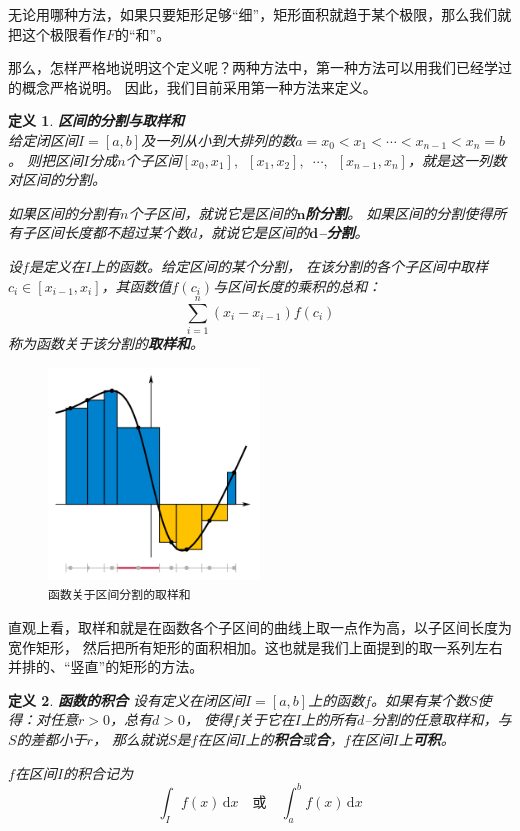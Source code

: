\documentclass[12pt,UTF8]{ctexbook}
\newcommand{\di}[1]{\,\mathrm{d}#1}
\newtheorem{df}{定义}[section]
\begin{document}
无论用哪种方法，如果只要矩形足够“细”，矩形面积就趋于某个极限，那么我们就把这个极限看作$F$的“和”。

那么，怎样严格地说明这个定义呢？两种方法中，第一种方法可以用我们已经学过的概念严格说明。
因此，我们目前采用第一种方法来定义。

\begin{df}{\textbf{区间的分割与取样和}}
    \mbox{} \\
    给定闭区间$I=[a, b]$及一列从小到大排列的数$a = x_0 < x_1 < \cdots < x_{n-1} < x_n = b$。
    则把区间$I$分成$n$个子区间$[x_0, x_1], \,\,\, [x_1, x_2], \,\,\,\cdots, \,\,\,[x_{n-1}, x_n]$，就是这一列数对区间的分割。

    如果区间的分割有$n$个子区间，就说它是区间的$\boldsymbol{n}$\textbf{阶分割}。
    如果区间的分割使得所有子区间长度都不超过某个数$d$，就说它是区间的$\boldsymbol{d}$\textbf{–分割}。

    设$f$是定义在$I$上的函数。给定区间的某个分割，
    在该分割的各个子区间中取样$c_i\in [x_{i-1}, x_{i}]$，其函数值$f(c_i)$与区间长度的乘积的总和：
    $$ \sum_{i=1}^n (x_i - x_{i-1}) f(c_i) $$
    称为函数关于该分割的\textbf{取样和}。
\end{df}

\begin{figure}[h] %
    \vspace{4pt}
    \centering
    \includegraphics[width=0.5\textwidth]{积分定义4.png} %
    \caption*{\texttt{函数关于区间分割的取样和}}
\end{figure}

直观上看，取样和就是在函数各个子区间的曲线上取一点作为高，以子区间长度为宽作矩形，
然后把所有矩形的面积相加。这也就是我们上面提到的取一系列左右并排的、“竖直”的矩形的方法。

\begin{df}{\textbf{函数的积合}}
    设有定义在闭区间$I=[a, b]$上的函数$f$。如果有某个数$S$使得：对任意$r>0$，总有$d>0$，
    使得$f$关于它在$I$上的所有$d$–分割的任意取样和，与$S$的差都小于$r$，
    那么就说$S$是$f$在区间$I$上的\textbf{积合}或\textbf{合}，$f$在区间$I$上\textbf{可积}。
    
    $f$在区间$I$的积合记为
    $$ \int_I f(x)\di{x} \quad \mbox{或} \quad \int_a^b f(x)\di{x} $$
\end{df}
\end{document}

